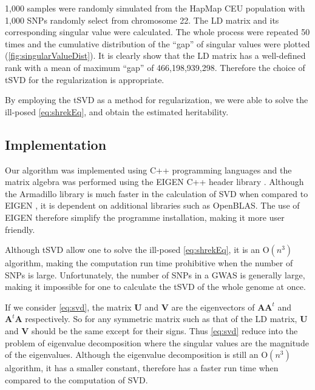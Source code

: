 			1,000 samples were randomly simulated from the HapMap\citep{Altshuler2010} \acrshort{CEU} population with
			1,000 \glspl{SNP} randomly select from chromosome 22. 
			The \gls{LD} matrix and its corresponding singular value were calculated. 
			The whole process were repeated 50 times and the cumulative distribution of the ``gap'' of singular values were plotted (\cref{fig:singularValueDist}). 
			It is clearly show that the \gls{LD} matrix has a well-defined rank with a mean of maximum ``gap'' of 466,198,939,298.
			Therefore the choice of \gls{tSVD} for the regularization is appropriate.
			
			By employing the \gls{tSVD} as a method for regularization, we were able to solve the ill-posed \cref{eq:shrekEq}, and obtain the estimated heritability.
		\subsection{Implementation}
			Our algorithm was implemented using C++ programming languages and the matrix algebra was performed using the EIGEN C++ header library \citep{eigenweb}.
			Although the Armadillo library \citep{Sanderson2010} is much faster in the calculation of \gls{SVD} when compared to EIGEN \citep{Ho2011}, it is dependent on additional libraries such as OpenBLAS. 
			The use of EIGEN therefore simplify the programme installation, making it more user friendly. 
			
			Although \gls{tSVD} allow one to solve the ill-posed \cref{eq:shrekEq}, it is an $\mathrm{O}(n^3)$ algorithm, making the computation run time prohibitive when the number of \glspl{SNP} is large.
			Unfortunately, the number of \glspl{SNP} in a \gls{GWAS} is generally large, making it impossible for one to calculate the \gls{tSVD} of the whole genome at once. 
			
			If we consider \cref{eq:svd}, the matrix $\boldsymbol{U}$ and $\boldsymbol{V}$ are the eigenvectors of $\boldsymbol{AA}^t$ and $\boldsymbol{A}^t\boldsymbol{A}$ respectively. 
			So for any symmetric matrix such as that of the \gls{LD} matrix, $\boldsymbol{U}$ and $\boldsymbol{V}$ should be the same except for their signs. 
			Thus \cref{eq:svd} reduce into the problem of eigenvalue decomposition where the singular values are the magnitude of the eigenvalues. 
			Although the eigenvalue decomposition is still an $\mathrm{O}(n^3)$ algorithm, it has a smaller constant, therefore has a faster run time when compared to the computation of \gls{SVD}. 
			
